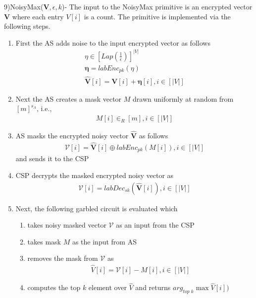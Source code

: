 9)\textsf{NoisyMax}($\mathbf{V},\epsilon,k$)- The input to the NoisyMax primitive is an encrypted vector $\mathbf{V}$ where each entry $V[i]$ is a count. The primitive is implemented via the following steps.  \begin{enumerate}
\item First the \textsf{AS} adds noise to the input encrypted vector as follows \begin{gather*} \eta \in [Lap(\frac{1}{\epsilon})]^{|V|}\\\boldsymbol{\eta}=labEnc_{pk}(\eta)\\\mathbf{\hat{{V}}}[i]=\mathbf{V}[i]+ \boldsymbol{\eta}[i], i \in [|V|] \end{gather*} \item Next the \textsf{AS} creates a mask vector $M$ drawn uniformly at random from $[m]^{s_A}$, i.e.,  \begin{gather*} M[i] \in_R [m], i \in [|V|]\end{gather*} \item \textsf{AS} masks the encrypted noisy vector $\mathbf{\hat{V}}$  as follows \begin{gather*}\boldsymbol{\mathcal{V}}[i]= \mathbf{\hat{V}}[i] \oplus labEnc_{pk}(M[i]), i \in [|V|]\end{gather*} and sends it to the \textsf{CSP} \item \textsf{CSP} decrypts the masked encrypted noisy vector as \begin{gather*}\mathcal{V}[i]=labDec_{sk}(\mathbf{\hat{V}}[i]), i \in [|V|]\end{gather*} \item Next, the following garbled circuit is evaluated which
    \begin{enumerate}[label=\roman*]\item takes noisy masked  vector $\mathcal{V}$ as an input from the \textsf{CSP} \item takes mask $M$ as the input from \textsf{AS}  \item removes the mask from  $\mathcal{V}$  as \begin{gather*} \hat{V}[i]=\mathcal{V}[i]-M[i], i \in [|V|]\end{gather*}  \item computes the top $k$ element over  $\hat{V}$ and returns $arg_{\textit{top k}}\max{\hat{V}[i])}$
    \end{enumerate}
    \end{enumerate}
